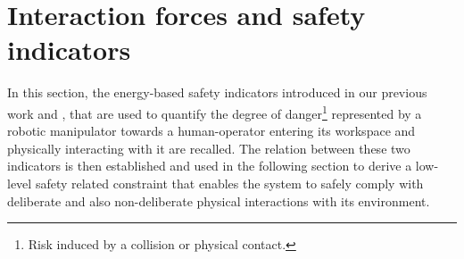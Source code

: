 \documentclass[letterpaper, 10 pt, conference]{ieeeconf}      %
\begin{document}
\section{Interaction forces and safety indicators}
\label{sec:inter1}
In this section, the energy-based safety indicators introduced in our previous work \cite{meguenani2015control} and \cite{meguenani2016energy}, that are used to quantify the degree of danger\footnote{Risk induced by a collision or physical contact.} represented by a robotic manipulator towards a human-operator entering its workspace and physically interacting with it are recalled. The relation between these two indicators is then established and used in the following section to derive a low-level safety related constraint that enables the system to safely comply with deliberate and also non-deliberate physical interactions with its environment.
%
\end{document}
